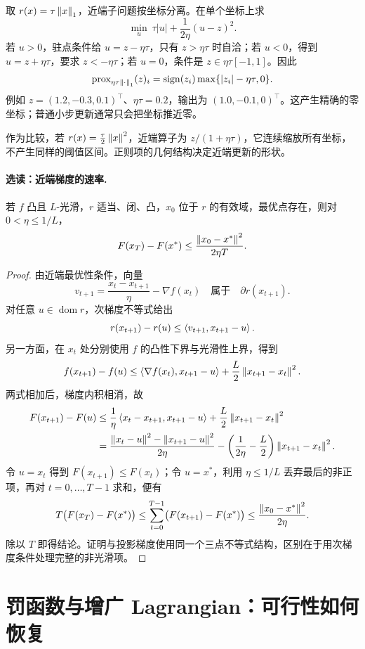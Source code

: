 \begin{example}[软阈值与稀疏更新]
\label{l2:ex-soft-threshold}
取 $r(x)=\tau\left\lVert x\right\rVert_1$，近端子问题按坐标分离。在单个坐标上求
\[
 \min_u\ \tau|u|+\frac1{2\eta}(u-z)^2.
\]
若 $u>0$，驻点条件给 $u=z-\eta\tau$，只有 $z>\eta\tau$ 时自洽；若 $u<0$，得到 $u=z+\eta\tau$，要求 $z<-\eta\tau$；若 $u=0$，条件是 $z\in\eta\tau[-1,1]$。因此
\[
 \operatorname{prox}_{\eta\tau\left\lVert\cdot\right\rVert_1}(z)_i
 =\operatorname{sign}(z_i)\max\{|z_i|-\eta\tau,0\}.
\]
例如 $z=(1.2,-0.3,0.1)^\top$、$\eta\tau=0.2$，输出为 $(1.0,-0.1,0)^\top$。这产生精确的零坐标；普通小步更新通常只会把坐标推近零。

作为比较，若 $r(x)=\tfrac\tau2\left\lVert x\right\rVert^2$，近端算子为 $z/(1+\eta\tau)$，它连续缩放所有坐标，不产生同样的阈值区间。正则项的几何结构决定近端更新的形状。
\end{example}

\paragraph{选读：近端梯度的速率.}
若 $f$ 凸且 $L$-光滑，$r$ 适当、闭、凸，$x_0$ 位于 $r$ 的有效域，最优点存在，则对 $0<\eta\leq1/L$，
\[
 F(x_T)-F(x^*)\leq\frac{\left\lVert x_0-x^*\right\rVert^2}{2\eta T}.
\]
\begin{proof}
由近端最优性条件，向量
\[
 v_{t+1}=\frac{x_t-x_{t+1}}\eta-\nabla f(x_t)
 \quad\text{属于}\quad\partial r(x_{t+1}).
\]
对任意 $u\in\operatorname{dom}r$，次梯度不等式给出
\[
 r(x_{t+1})-r(u)\leq\left\langle v_{t+1},x_{t+1}-u\right\rangle.
\]
另一方面，在 $x_t$ 处分别使用 $f$ 的凸性下界与光滑性上界，得到
\[
 f(x_{t+1})-f(u)
 \leq\left\langle\nabla f(x_t),x_{t+1}-u\right\rangle
       +\frac L2\left\lVert x_{t+1}-x_t\right\rVert^2.
\]
两式相加后，梯度内积相消，故
\begin{align*}
 F(x_{t+1})-F(u)
 &\leq\frac1\eta\left\langle x_t-x_{t+1},x_{t+1}-u\right\rangle
       +\frac L2\left\lVert x_{t+1}-x_t\right\rVert^2\\
 &=\frac{\left\lVert x_t-u\right\rVert^2-\left\lVert x_{t+1}-u\right\rVert^2}{2\eta}
   -\left(\frac1{2\eta}-\frac L2\right)
       \left\lVert x_{t+1}-x_t\right\rVert^2.
\end{align*}
令 $u=x_t$ 得到 $F(x_{t+1})\leq F(x_t)$；令 $u=x^*$，利用
$\eta\leq1/L$ 丢弃最后的非正项，再对 $t=0,\ldots,T-1$ 求和，便有
\[
 T\bigl(F(x_T)-F(x^*)\bigr)
 \leq\sum_{t=0}^{T-1}\bigl(F(x_{t+1})-F(x^*)\bigr)
 \leq\frac{\left\lVert x_0-x^*\right\rVert^2}{2\eta}.
\]
除以 $T$ 即得结论。证明与投影梯度使用同一个三点不等式结构，区别在于用次梯度条件处理完整的非光滑项。
\end{proof}

\section{罚函数与增广 Lagrangian：可行性如何恢复}
\label{l2:penalty}

